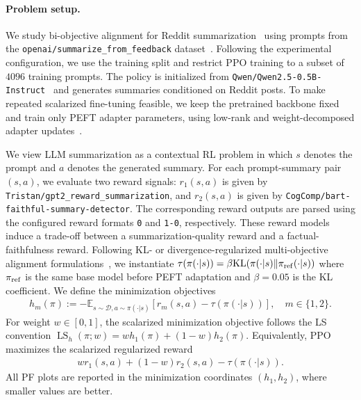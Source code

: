 \documentclass{article}
\newcommand{\LS}{\operatorname{LS}}
\begin{document}
\paragraph{Problem setup.}
We study bi-objective alignment for Reddit summarization~\citep{volske2017tl} using prompts from the \texttt{openai/summarize\_from\_feedback} dataset~\citep{stiennon2020learning}. 
Following the experimental configuration, we use the training split and restrict PPO training to a subset of $4096$ training prompts. 
The policy is initialized from \texttt{Qwen/Qwen2.5-0.5B-Instruct}~\citep{qwen2025qwen25technicalreport} and generates summaries conditioned on Reddit posts. 
To make repeated scalarized fine-tuning feasible, we keep the pretrained backbone fixed and train only PEFT adapter parameters, using low-rank and weight-decomposed adapter updates~\citep{hu2022lora,liu2024dora}. 

We view LLM summarization as a contextual RL problem in which $s$ denotes the prompt and $a$ denotes the generated summary. 
For each prompt-summary pair $(s,a)$, we evaluate two reward signals:
$r_1(s,a)$ is given by \texttt{Tristan/gpt2\_reward\_summarization}, and
$r_2(s,a)$ is given by \texttt{CogComp/bart-faithful-summary-detector}. 
The corresponding reward outputs are parsed using the configured reward formats \texttt{0} and \texttt{1-0}, respectively. 
These reward models induce a trade-off between a summarization-quality reward and a factual-faithfulness reward. 
Following KL- or divergence-regularized multi-objective alignment formulations~\citep{wang2024conditional,shi2024decoding}, we instantiate
$\tau(\pi(\cdot|s))
=
\beta \mathrm{KL}\!\left(
\pi(\cdot|s) \| \pi_{\rm ref}(\cdot|s)
\right)$
where $\pi_{\rm ref}$ is the same base model before PEFT adaptation and $\beta=0.05$ is the KL coefficient. 
We define the minimization objectives
\begin{align}
 h_m(\pi)
 :=
 -\mathbb{E}_{s\sim\mathcal D, a\sim \pi(\cdot|s)}
 \left[
 r_m(s,a)
 -
 \tau(\pi(\cdot|s))
 \right],
 \quad m\in\{1,2\}.
 \label{eq:llm_objective}
\end{align}
For weight $w\in[0,1]$, the scalarized minimization objective follows the LS convention $\LS_h(\pi;w)
 =
 w h_1(\pi)+(1-w)h_2(\pi)$.
Equivalently, PPO maximizes the scalarized regularized reward
\begin{align}
 w r_1(s,a)+(1-w)r_2(s,a)
 -
 \tau(\pi(\cdot|s)).
\end{align}
All PF plots are reported in the minimization coordinates $(h_1,h_2)$, where smaller values are better.
\end{document}
